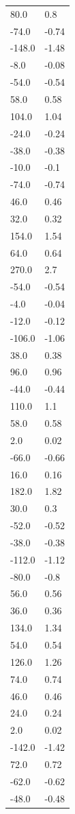 \begin{longtable}{ll}
80.0 & 0.8 \\
-74.0 & -0.74 \\
-148.0 & -1.48 \\
-8.0 & -0.08 \\
-54.0 & -0.54 \\
58.0 & 0.58 \\
104.0 & 1.04 \\
-24.0 & -0.24 \\
-38.0 & -0.38 \\
-10.0 & -0.1 \\
-74.0 & -0.74 \\
46.0 & 0.46 \\
32.0 & 0.32 \\
154.0 & 1.54 \\
64.0 & 0.64 \\
270.0 & 2.7 \\
-54.0 & -0.54 \\
-4.0 & -0.04 \\
-12.0 & -0.12 \\
-106.0 & -1.06 \\
38.0 & 0.38 \\
96.0 & 0.96 \\
-44.0 & -0.44 \\
110.0 & 1.1 \\
58.0 & 0.58 \\
2.0 & 0.02 \\
-66.0 & -0.66 \\
16.0 & 0.16 \\
182.0 & 1.82 \\
30.0 & 0.3 \\
-52.0 & -0.52 \\
-38.0 & -0.38 \\
-112.0 & -1.12 \\
-80.0 & -0.8 \\
56.0 & 0.56 \\
36.0 & 0.36 \\
134.0 & 1.34 \\
54.0 & 0.54 \\
126.0 & 1.26 \\
74.0 & 0.74 \\
46.0 & 0.46 \\
24.0 & 0.24 \\
2.0 & 0.02 \\
-142.0 & -1.42 \\
72.0 & 0.72 \\
-62.0 & -0.62 \\
-48.0 & -0.48 \\

\end{longtable}
